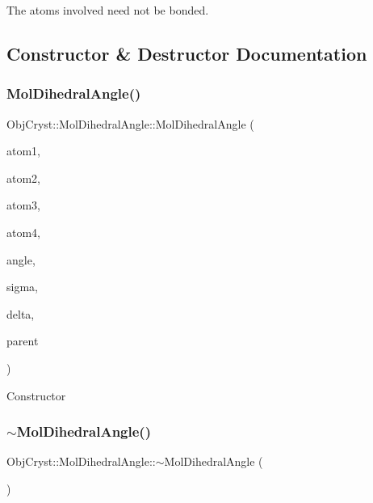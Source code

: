 The atoms involved need not be bonded. 

\subsection{Constructor \& Destructor Documentation}
\mbox{\label{class_obj_cryst_1_1_mol_dihedral_angle_abae4150558beac4a71498f471c22465e}} 
\subsubsection{\texorpdfstring{MolDihedralAngle()}{MolDihedralAngle()}}
{\footnotesize\ttfamily Obj\+Cryst\+::\+Mol\+Dihedral\+Angle\+::\+Mol\+Dihedral\+Angle (\begin{DoxyParamCaption}\item[{\mbox{\hyperlink{class_obj_cryst_1_1_mol_atom}{Mol\+Atom}} \&}]{atom1,  }\item[{\mbox{\hyperlink{class_obj_cryst_1_1_mol_atom}{Mol\+Atom}} \&}]{atom2,  }\item[{\mbox{\hyperlink{class_obj_cryst_1_1_mol_atom}{Mol\+Atom}} \&}]{atom3,  }\item[{\mbox{\hyperlink{class_obj_cryst_1_1_mol_atom}{Mol\+Atom}} \&}]{atom4,  }\item[{const R\+E\+AL}]{angle,  }\item[{const R\+E\+AL}]{sigma,  }\item[{const R\+E\+AL}]{delta,  }\item[{\mbox{\hyperlink{class_obj_cryst_1_1_molecule}{Molecule}} \&}]{parent }\end{DoxyParamCaption})}

Constructor \mbox{\label{class_obj_cryst_1_1_mol_dihedral_angle_a82685f5d7c3f96a006daaf5c691b84cc}} 
\subsubsection{\texorpdfstring{$\sim$MolDihedralAngle()}{~MolDihedralAngle()}}
{\footnotesize\ttfamily Obj\+Cryst\+::\+Mol\+Dihedral\+Angle\+::$\sim$\+Mol\+Dihedral\+Angle (\begin{DoxyParamCaption}{ }\end{DoxyParamCaption})\hspace{0.3cm}{\ttfamily [virtual]}}

